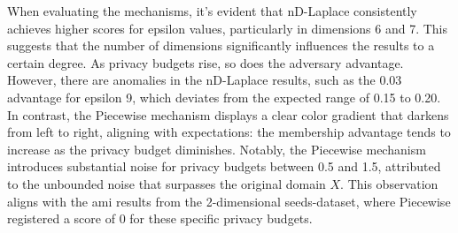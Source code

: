When evaluating the mechanisms, it's evident that nD-Laplace consistently achieves higher scores for epsilon values, particularly in dimensions 6 and 7. This suggests that the number of dimensions significantly influences the results to a certain degree. As privacy budgets rise, so does the adversary advantage. However, there are anomalies in the nD-Laplace results, such as the 0.03 advantage for epsilon 9, which deviates from the expected range of 0.15 to 0.20. In contrast, the Piecewise mechanism displays a clear color gradient that darkens from left to right, aligning with expectations: the membership advantage tends to increase as the privacy budget diminishes. Notably, the Piecewise mechanism introduces substantial noise for privacy budgets between 0.5 and 1.5, attributed to the unbounded noise that surpasses the original domain $X$. This observation aligns with the \gls{ami} results from the 2-dimensional seeds-dataset, where Piecewise registered a score of 0 for these specific privacy budgets.

